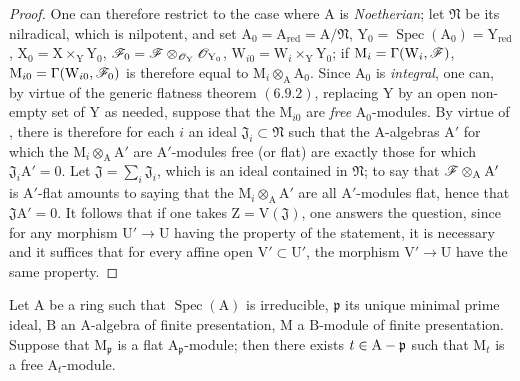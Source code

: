 \begin{proof}
One can therefore restrict to the case where $\mathrm{A}$ is \emph{Noetherian}; let $\mathfrak{N}$ be its nilradical, which is
nilpotent, and set $\mathrm{A}_0=\mathrm{A}_{\mathrm{red}}=\mathrm{A}/\mathfrak{N}$, $\mathrm{Y}_0=\operatorname{Spec}(\mathrm{A}_0)=\mathrm{Y}_{\mathrm{red}}$, $\mathrm{X}_0=\mathrm{X}\times_\mathrm{Y}\mathrm{Y}_0$, $\mathscr{F}_0=\mathscr{F}\otimes_{\mathscr{O}_\mathrm{Y}}\mathscr{O}_{\mathrm{Y}_0}$,
$\mathrm{W}_{i0}=\mathrm{W}_i\times_\mathrm{Y}\mathrm{Y}_0$; if $\mathrm{M}_i=\Gamma(\mathrm{W}_i,\mathscr{F})$, $\mathrm{M}_{i0}=\Gamma(\mathrm{W}_{i0},\mathscr{F}_0)$ is therefore equal to $\mathrm{M}_i\otimes_\mathrm{A}\mathrm{A}_0$.
Since $\mathrm{A}_0$ is \emph{integral}, one can, by virtue of the generic flatness theorem $(6.9.2)$,
replacing $\mathrm{Y}$ by an open non-empty set of $\mathrm{Y}$ as needed, suppose that the $\mathrm{M}_{i0}$ are
\emph{free} $\mathrm{A}_0$-modules. By virtue of , there is therefore for each $i$ an ideal $\mathfrak{J}_i\subset\mathfrak{N}$ such
that the $\mathrm{A}$-algebras $\mathrm{A}'$ for which the $\mathrm{M}_i\otimes_\mathrm{A}\mathrm{A}'$ are $\mathrm{A}'$-modules free (or flat)
are exactly those for which $\mathfrak{J}_i\mathrm{A}'=0$. Let $\mathfrak{J}=\sum_i\mathfrak{J}_i$, which is an ideal contained
in $\mathfrak{N}$; to say that $\mathscr{F}\otimes_{\mathrm{A}}\mathrm{A}'$ is $\mathrm{A}'$-flat amounts to saying that the $\mathrm{M}_i\otimes_\mathrm{A}\mathrm{A}'$ are all
$\mathrm{A}'$-modules flat, hence that $\mathfrak{J}\mathrm{A}'=0$. It follows that if one takes $\mathrm{Z}=\mathrm{V}(\mathfrak{J})$, one
answers the question, since for any morphism $\mathrm{U}'\to\mathrm{U}$ having the property of the statement,
it is necessary and it suffices that for every affine open $\mathrm{V}'\subset\mathrm{U}'$, the morphism $\mathrm{V}'\to\mathrm{U}$
have the same property.
\end{proof}

\begin{corollary}[11.4.6]
\label{IV.11.4.6}
Let $\mathrm{A}$ be a ring such that $\operatorname{Spec}(\mathrm{A})$ is irreducible, $\mathfrak{p}$ its unique
minimal prime ideal, $\mathrm{B}$ an $\mathrm{A}$-algebra of finite presentation, $\mathrm{M}$ a $\mathrm{B}$-module of finite presentation.
Suppose that $\mathrm{M}_\mathfrak{p}$ is a flat $\mathrm{A}_\mathfrak{p}$-module; then there exists $t\in\mathrm{A}-\mathfrak{p}$ such that $\mathrm{M}_t$ is a free $\mathrm{A}_t$-module.
\end{corollary}

